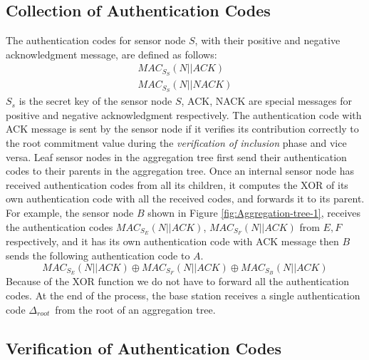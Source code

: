 	\subsection{Collection of Authentication Codes}
		\label{subsection:collection-of-authentication-codes}
		The authentication codes for sensor node $S$, with their positive and negative acknowledgment message, are defined as follows:
		\begin{equation}
			\begin{array}{l}
				MAC_{S_{S}}(N || ACK)\\
				MAC_{S_{S}}(N || NACK)
			\end{array}
		\end{equation}
		$S_{s}$ is the secret key of the sensor node $S$,	ACK, NACK are special messages for positive and negative acknowledgment respectively.
		The authentication code with ACK message is sent by the sensor node if it verifies its contribution correctly to the root commitment value during the \textit{verification of inclusion} phase and vice versa.
		Leaf sensor nodes in the aggregation tree first send their authentication codes to their parents in the aggregation tree.
		Once an internal sensor node has received authentication codes from all its children, it computes the XOR of its own authentication code with all the received codes, and forwards it to its parent.
		For example, the sensor node $B$ shown in Figure \ref{fig:Aggregation-tree-1}, receives the authentication codes $MAC_{S_{E}}(N||ACK)$, $MAC_{S_{F}}(N||ACK)$ from $E,F$ respectively, and it has its own authentication code with ACK message then $B$ sends the following authentication code to $A$.
			\begin{equation}
				MAC_{S_{E}}(N||ACK) \oplus MAC_{S_{F}}(N||ACK) \oplus MAC_{S_{B}}(N||ACK)
			\end{equation}
		Because of the XOR function we do not have to forward all the authentication codes. 
		At the end of the process, the base station receives a single authentication code $\Delta_{root}$\ from the root of an aggregation tree.

	\subsection{Verification of Authentication Codes}
		\label{sec:verficiation-of-authentication-codes}
		
